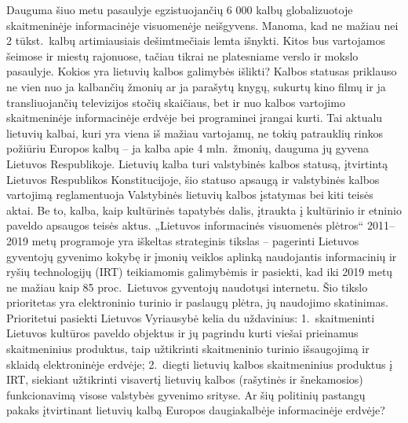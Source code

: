 \begin{multicols}{2}
Dauguma šiuo metu pasaulyje egzistuojančių 6 000 kalbų globalizuotoje skaitmeninėje informacinėje visuomenėje neišgyvens. Manoma, kad ne mažiau nei 2 tūkst.~kalbų artimiausiais dešimtmečiais lemta išnykti. Kitos bus vartojamos šeimose ir miestų rajonuose, tačiau tikrai ne platesniame verslo ir mokslo pasaulyje. Kokios yra lietuvių kalbos galimybės išlikti? Kalbos statusas priklauso ne vien nuo ja kalbančių žmonių ar ja parašytų knygų, sukurtų kino filmų ir ja transliuojančių televizijos stočių skaičiaus, bet ir nuo kalbos vartojimo skaitmeninėje informacinėje erdvėje bei programinei įrangai kurti. Tai aktualu lietuvių kalbai, kuri yra viena iš mažiau vartojamų, ne tokių patrauklių rinkos požiūriu Europos kalbų – ja kalba apie 4 mln.~žmonių, dauguma jų gyvena Lietuvos Respublikoje. Lietuvių kalba turi valstybinės kalbos statusą, įtvirtintą Lietuvos Respublikos Konstitucijoje, šio statuso apsaugą ir valstybinės kalbos vartojimą reglamentuoja Valstybinės lietuvių kalbos įstatymas bei kiti teisės aktai. Be to, kalba, kaip kultūrinės tapatybės dalis, įtraukta į kultūrinio ir etninio paveldo apsaugos teisės aktus. „Lietuvos informacinės visuomenės plėtros“ 2011–2019 metų programoje yra iškeltas strateginis tikslas – pagerinti Lietuvos gyventojų gyvenimo kokybę ir įmonių veiklos aplinką naudojantis informacinių ir ryšių technologijų (IRT) teikiamomis galimybėmis ir pasiekti, kad iki 2019 metų ne mažiau kaip 85 proc.~Lietuvos gyventojų naudotųsi internetu. Šio tikslo prioritetas yra elektroninio turinio ir paslaugų plėtra, jų naudojimo skatinimas. Prioritetui pasiekti Lietuvos Vyriausybė kelia du uždavinius: 1.~skaitmeninti Lietuvos kultūros paveldo objektus ir jų pagrindu kurti viešai prieinamus skaitmeninius produktus, taip užtikrinti skaitmeninio turinio išsaugojimą ir sklaidą elektroninėje erdvėje; 2.~diegti lietuvių kalbos skaitmeninius produktus į IRT, siekiant užtikrinti visavertį lietuvių kalbos (rašytinės ir šnekamosios) funkcionavimą visose valstybės gyvenimo srityse. Ar šių politinių pastangų pakaks įtvirtinant lietuvių kalbą Europos daugiakalbėje informacinėje erdvėje? 


\end{multicols}
